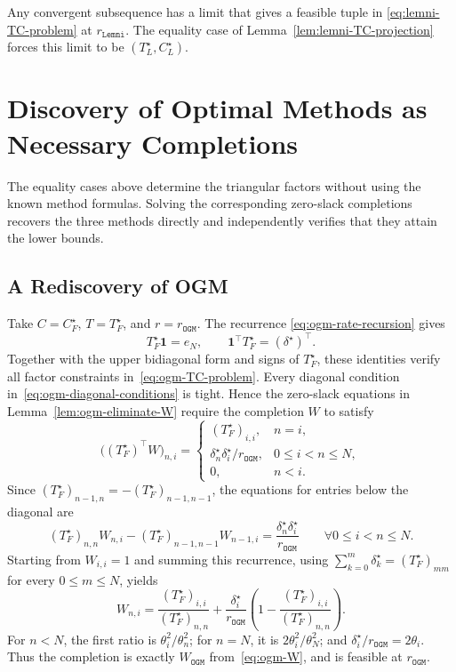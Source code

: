 \documentclass[11pt]{article}
\newcommand{\one}{\mathbf 1}
\begin{document}
Any convergent subsequence has a limit that gives a feasible tuple in
\eqref{eq:lemni-TC-problem} at $r_\mathtt{Lemni}$. The equality case of
Lemma~\ref{lem:lemni-TC-projection} forces this limit to be
$(T_L^\star,C_L^\star)$.



\section{Discovery of Optimal Methods as Necessary Completions} \label{app:rediscovery}

The equality cases above determine the triangular factors without using the
known method formulas. Solving the corresponding zero-slack completions
recovers the three methods directly and independently verifies that they
attain the lower bounds.

\subsection{A Rediscovery of OGM} \label{subsec:discovering-ogm}

Take $C=C_F^\star$, $T=T_F^\star$, and $r=r_\mathtt{OGM}$. The recurrence
\eqref{eq:ogm-rate-recursion} gives
\[
T_F^\star\one=e_N,
\qquad
\one^\top T_F^\star=(\delta^\star)^\top.
\]
Together with the upper bidiagonal form and signs of $T_F^\star$, these
identities verify all factor constraints in~\eqref{eq:ogm-TC-problem}.
Every diagonal condition in~\eqref{eq:ogm-diagonal-conditions} is tight. Hence
the zero-slack equations in Lemma~\ref{lem:ogm-eliminate-W} require the
completion $W$ to satisfy
\begin{equation}\label{eq:forward-tight-completion}
\bigl((T_F^\star)^\top W\bigr)_{n,i}
=
\begin{cases}
(T_F^\star)_{i,i},&n=i,\\[1mm]
\delta_n^\star\delta_i^\star/r_\mathtt{OGM},&0\leq i<n\leq N,\\[1mm]
0,&n<i.
\end{cases}
\end{equation}
Since $(T_F^\star)_{n-1,n}=-(T_F^\star)_{n-1,n-1}$, the equations for entries below the diagonal are
\[
(T_F^\star)_{n,n}W_{n,i}-(T_F^\star)_{n-1,n-1}W_{n-1,i}
=\frac{\delta_n^\star\delta_i^\star}{r_\mathtt{OGM}}
\qquad \forall 0\leq i<n\leq N.
\]
Starting from $W_{i,i}=1$ and summing this recurrence, using
$\sum_{k=0}^m\delta_k^\star=(T_F^\star)_{mm}$ for every $0\leq m\leq N$, yields
\[
W_{n,i}
=\frac{(T_F^\star)_{i,i}}{(T_F^\star)_{n,n}}
+\frac{\delta_i^\star}{r_\mathtt{OGM}}
\left(1-\frac{(T_F^\star)_{i,i}}{(T_F^\star)_{n,n}}\right).
\]
For $n<N$, the first ratio is $\theta_i^2/\theta_n^2$; for $n=N$, it is
$2\theta_i^2/\theta_N^2$; and
$\delta_i^\star/r_\mathtt{OGM}=2\theta_i$. Thus the completion is exactly
$W_\mathtt{OGM}$ from~\eqref{eq:ogm-W}, and is feasible at
$r_\mathtt{OGM}$.
\end{document}
